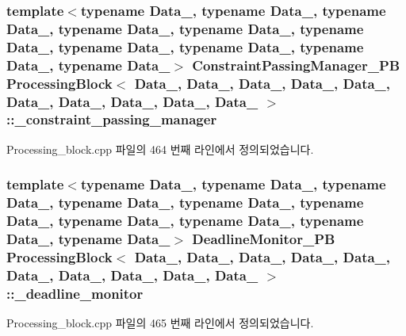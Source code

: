 \subsubsection[{\texorpdfstring{\+\_\+constraint\+\_\+passing\+\_\+manager}{_constraint_passing_manager}}]{\setlength{\rightskip}{0pt plus 5cm}template$<$typename Data\+\_, typename Data\+\_, typename Data\+\_, typename Data\+\_, typename Data\+\_, typename Data\+\_, typename Data\+\_, typename Data\+\_, typename Data\+\_, typename Data\+\_$>$ {\bf Constraint\+Passing\+Manager\+\_\+\+PB} {\bf Processing\+Block}$<$ Data\+\_, Data\+\_, Data\+\_, Data\+\_, Data\+\_, Data\+\_, Data\+\_, Data\+\_, Data\+\_, Data\+\_ $>$\+::\+\_\+constraint\+\_\+passing\+\_\+manager\hspace{0.3cm}{\ttfamily [private]}}\hypertarget{classProcessingBlock_a5dd352289efbd6a8e930033c4f705586}{}\label{classProcessingBlock_a5dd352289efbd6a8e930033c4f705586}


Processing\+\_\+block.\+cpp 파일의 464 번째 라인에서 정의되었습니다.

\subsubsection[{\texorpdfstring{\+\_\+deadline\+\_\+monitor}{_deadline_monitor}}]{\setlength{\rightskip}{0pt plus 5cm}template$<$typename Data\+\_, typename Data\+\_, typename Data\+\_, typename Data\+\_, typename Data\+\_, typename Data\+\_, typename Data\+\_, typename Data\+\_, typename Data\+\_, typename Data\+\_$>$ {\bf Deadline\+Monitor\+\_\+\+PB} {\bf Processing\+Block}$<$ Data\+\_, Data\+\_, Data\+\_, Data\+\_, Data\+\_, Data\+\_, Data\+\_, Data\+\_, Data\+\_, Data\+\_ $>$\+::\+\_\+deadline\+\_\+monitor\hspace{0.3cm}{\ttfamily [private]}}\hypertarget{classProcessingBlock_a33a0fcb9837f2b6920fc3ddd320906f0}{}\label{classProcessingBlock_a33a0fcb9837f2b6920fc3ddd320906f0}


Processing\+\_\+block.\+cpp 파일의 465 번째 라인에서 정의되었습니다.

